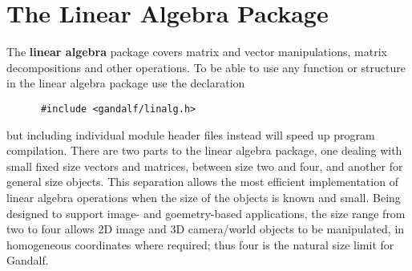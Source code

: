 \chapter{The Linear Algebra Package} \label{linalg-chapter}
The {\bf linear algebra} package covers matrix and vector manipulations,
matrix decompositions and other operations.
To be able to use any function or structure in the linear algebra package
use the declaration
\begin{verbatim}
      #include <gandalf/linalg.h>
\end{verbatim}
but including individual module header files instead will speed up program
compilation.
There are two parts to the linear algebra package, one dealing with small
fixed size vectors and matrices, between size two and four, and another
for general size objects. This separation allows the most efficient
implementation of linear algebra operations when the size of the objects
is known and small. Being designed to support image- and goemetry-based
applications, the size range from two to four allows 2D image and
3D camera/world objects to be manipulated, in homogeneous coordinates
where required; thus four is the natural size limit for Gandalf.

